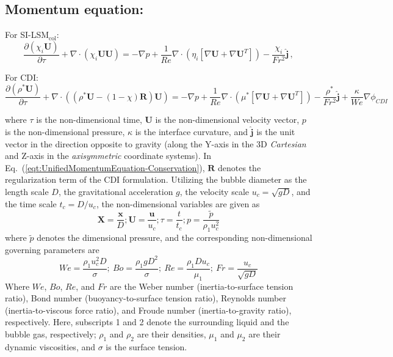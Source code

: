 \documentclass[a4paper,fleqn]{cas-sc}
\begin{document}
	\subsection*{Momentum equation:}
	\noindent For SI-LSM$_{\text{col}}$:
	\begin{equation}\label{eqt:momEqt-SI}
		\frac{\partial(\chi_{i}\mathbf{U})}{\partial\tau}+\nabla\cdot(\chi_{i}\mathbf{U}\mathbf{U})=-\nabla p+\frac{1}{Re}\nabla\cdot(\eta_{i}[\nabla\mathbf{U}+\nabla\mathbf{U}^T])-\frac{\chi_{i}}{Fr^2}\hat{\mathbf{j}}\, ,
	\end{equation}
	
	\noindent For CDI:
	\begin{equation}\label{eqt:UnifiedMomentumEquation-Conservation}
		\frac{\partial(\rho^{*}\mathbf{U})}{\partial\tau}+\nabla\cdot((\rho^*\mathbf{U}-(1-\chi)\mathbf{R})\mathbf{U})=-\nabla p+\frac{1}{Re}\nabla\cdot(\mu^{*}[\nabla\mathbf{U}+\nabla\mathbf{U}^T])-\frac{\rho^*}{Fr^2}\hat{\mathbf{j}}+\frac{\kappa}{We}\nabla \phi_{CDI}
	\end{equation}
	
	\noindent where $\tau$ is the non-dimensional time, $\mathbf{U}$ is the non-dimensional velocity vector, $p$ is the non-dimensional pressure, $\kappa$ is the interface curvature, and $\hat{\mathbf{j}}$ is the unit vector in the direction opposite to gravity (along the Y-axis in the 3D \textit{Cartesian} and Z-axis in the \textit{axisymmetric} coordinate systems). In Eq.~(\ref{eqt:UnifiedMomentumEquation-Conservation}), $\mathbf{R}$ denotes the regularization term of the CDI formulation. Utilizing the bubble diameter as the length scale $D$, the gravitational acceleration $g$, the velocity scale $u_c=\sqrt{gD}$, and the time scale $t_c=D/u_c$, the non-dimensional variables are given as
	\begin{equation*}
		\mathbf{X}=\frac{\mathbf{x}}{D}; \mathbf{U}=\frac{\mathbf{u}}{u_c}; \tau=\frac{t}{t_c}; p=\frac{\tilde{p}}{\rho_1u_c^2}
	\end{equation*}
	where $\tilde{p}$ denotes the dimensional pressure, and the corresponding non-dimensional governing parameters are
	\begin{equation*}
		We=\frac{\rho_1 u_c^2D}{\sigma}; \ Bo=\frac{\rho_1gD^2}{\sigma}; \ Re=\frac{\rho_1Du_c}{\mu_1}; \ Fr=\frac{u_c}{\sqrt{gD}}
	\end{equation*}
	Where $We$, $Bo$, $Re$, and $Fr$ are the Weber number (inertia-to-surface tension ratio), Bond number (buoyancy-to-surface tension ratio), Reynolds number (inertia-to-viscous force ratio), and Froude number (inertia-to-gravity ratio), respectively. Here, subscripts 1 and 2 denote the surrounding liquid and the bubble gas, respectively; $\rho_1$ and $\rho_2$ are their densities, $\mu_1$ and $\mu_2$ are their dynamic viscosities, and $\sigma$ is the surface tension. 
	
\end{document}
